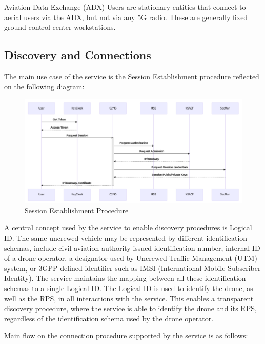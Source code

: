 \documentclass[a4paper,conference]{IEEEtran}
\begin{document}
Aviation Data Exchange (ADX) Users are stationary entities that connect to aerial users via the ADX, but not via any 5G radio. These are generally fixed ground control center workstations.

\subsection{Discovery and Connections}

The main use case of the service is the Session Establishment procedure reflected on the following diagram:

\begin{figure}[!ht]
\centering
\includegraphics[width=0.9\linewidth]{images/session.png}
\caption{Session Establishment Procedure}\label{fig:session}
\end{figure}

A central concept used by the service to enable discovery procedures is Logical ID. The same uncrewed vehicle may be represented by different identification schemas, include civil aviation authority-issued identification number, internal ID of a drone operator, a designator used by Uncrewed Traffic Management (UTM) system, or 3GPP-defined identifier such as IMSI (International Mobile Subscriber Identity). The service maintains the mapping between all these identification schemas to a single Logical ID. The Logical ID is used to identify the drone, as well as the RPS, in all interactions with the service. This enables a transparent discovery procedure, where the service is able to identify the drone and its RPS, regardless of the identification schema used by the drone operator.

Main flow on the connection procedure supported by the service is as follows:
\end{document}
